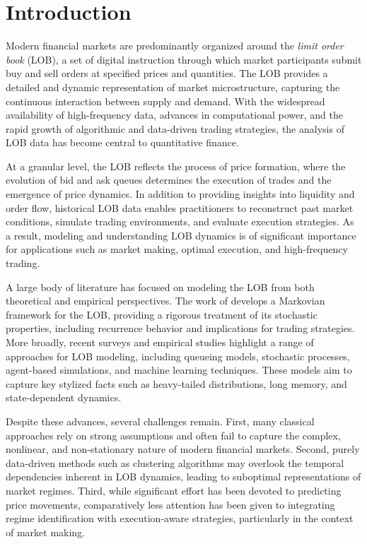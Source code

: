 \documentclass[12pt,a4paper]{report}
\begin{document}
\chapter{Introduction} 
\thispagestyle{plain}

Modern financial markets are predominantly organized around the \textit{limit order book} (LOB), a set of digital instruction  through which market participants submit buy and sell orders at specified prices and quantities. The LOB provides a detailed and dynamic representation of market microstructure, capturing the continuous interaction between supply and demand. With the widespread availability of high-frequency data, advances in computational power, and the rapid growth of algorithmic and data-driven trading strategies, the analysis of LOB data has become central to quantitative finance.

At a granular level, the LOB reflects the process of price formation, where the evolution of bid and ask queues determines the execution of trades and the emergence of price dynamics. In addition to providing insights into liquidity and order flow, historical LOB data enables practitioners to reconstruct past market conditions, simulate trading environments, and evaluate execution strategies. As a result, modeling and understanding LOB dynamics is of significant importance for applications such as market making, optimal execution, and high-frequency trading.

A large body of literature has focused on modeling the LOB from both theoretical and empirical perspectives. The work of \cite{ref2} develops a Markovian framework for the LOB, providing a rigorous treatment of its stochastic properties, including recurrence behavior and implications for trading strategies. More broadly, recent surveys and empirical studies highlight a range of approaches for LOB modeling, including queueing models, stochastic processes, agent-based simulations, and machine learning techniques. These models aim to capture key stylized facts such as heavy-tailed distributions, long memory, and state-dependent dynamics.

\cite{ref1}
\cite{ref3}
\cite{ref4}

Despite these advances, several challenges remain. First, many classical approaches rely on strong  assumptions and often fail to capture the complex, nonlinear, and non-stationary nature of modern financial markets. Second, purely data-driven methods such as clustering algorithms may overlook the temporal dependencies inherent in LOB dynamics, leading to suboptimal representations of market regimes. Third, while significant effort has been devoted to predicting price movements, comparatively less attention has been given to integrating regime identification with execution-aware strategies, particularly in the context of market making.
\end{document}
